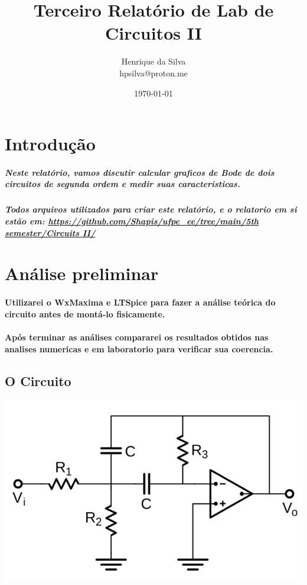 \documentclass[12pt,twoside, a4paper, twocolumn]{article}
\title{Terceiro Relatório de Lab de Circuitos II}
\author{Henrique da Silva \\ hpsilva@proton.me}
\date{\today}
\begin{document}
\maketitle
{}
\newpage
\tableofcontents
\newpage

\section{Introdução}


\subparagraph*{Neste relatório, vamos discutir calcular graficos de Bode de dois circuitos de segunda ordem e medir suas caracteristicas.}


\subparagraph*{Todos arquivos utilizados para criar este relatório, e o relatorio em si estão em:  \url{https://github.com/Shapis/ufpe_ee/tree/main/5th semester/Circuits II/}}








\section{Análise preliminar}


\paragraph*{Utilizarei o WxMaxima e LTSpice para fazer a análise teórica do circuito antes de montá-lo fisicamente.}


\paragraph*{Após terminar as análises compararei os resultados obtidos nas analises numericas e em laboratorio para verificar sua coerencia.}


\subsection{O Circuito}
\begin{adjustbox}{scale=0.30}
    \includegraphics{AnaliseNodal.png}
\end{adjustbox}
\newpage
\end{document}
